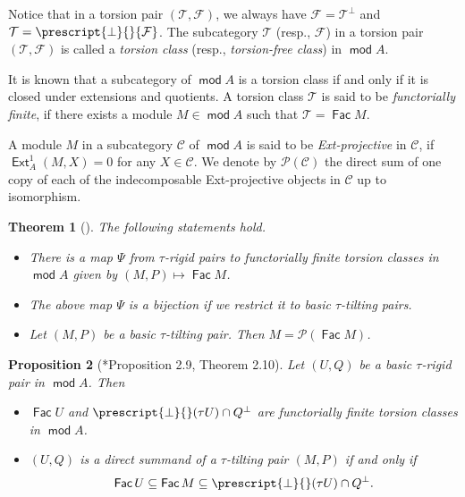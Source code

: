 \documentclass[10pt]{amsart}
\newtheorem{theorem}{Theorem}[section]
\newtheorem{proposition}[theorem]{Proposition}
\theoremstyle{definition}
\theoremstyle{remark}
\numberwithin{equation}{section}
\def\mod{\opname{mod}\nolimits}
\newcommand{\opname}[1]{\operatorname{\mathsf{#1}}}
\newcommand{\Ext}{\opname{Ext}}
\newcommand{\Fac}{\opname{Fac}}
\begin{document}
Notice that in a torsion pair  $(\mathcal T,\mathcal F)$, we always have $\mathcal F=\mathcal T^\bot$ and $\mathcal T= \prescript{\bot}{}{\mathcal F}$.  The subcategory $\mathcal T$ (resp., $\mathcal F$) in a torsion pair $(\mathcal T,\mathcal F)$ is called a \emph{torsion class} (resp., \emph{torsion-free class}) in $\mod A$. 

It is known that a subcategory of $\mod A$ is a torsion class if and only if it is closed under extensions and quotients.
A torsion class $\mathcal T$ is said to be {\em functorially finite}, if there exists a module $M\in\mod A$ such that $\mathcal T=\Fac M$.


A module $M$ in a subcategory $\mathcal C$ of $\mod A$ is said to be {\em Ext-projective} in $\mathcal C$, if 
$\Ext_A^1(M, X)=0$ for any $X\in\mathcal C$. We denote by $\mathcal P(\mathcal C)$ the direct sum of one copy of each of the indecomposable Ext-projective objects in $\mathcal C$ up to isomorphism.



\begin{theorem}[{\cite[Proposition 1.2, Theorem 2.7]{air_2014}}] \label{thm:air-torsion}
The following statements hold.
\begin{itemize}
    \item [(i)] There is a map $\Psi$ 
from $\tau$-rigid pairs to functorially finite torsion classes in $\mod A$
given by $(M,P)\mapsto \Fac M$.

\item[(ii)] The above map $\Psi$ is a bijection if we restrict it to basic $\tau$-tilting pairs.

\item[(iii)] Let $(M,P)$ be a basic $\tau$-tilting pair. Then $M=\mathcal P(\Fac M)$.
\end{itemize}
\end{theorem}



\begin{proposition}[\cite{air_2014}*{Proposition 2.9, Theorem 2.10}]\label{pro-minmax}
 Let $(U,Q)$ be a basic $\tau$-rigid pair in $\mod A$. Then
 \begin{itemize}
 \item[(i)]  $\Fac U$ and  $\prescript{\bot}{}({\tau U})\cap Q^\bot$ are functorially finite torsion classes in $\mod A$.
 \item[(ii)]  $(U,Q)$ is a direct summand of a $\tau$-tilting pair $(M,P)$ if and only if 
 \[\Fac U\subseteq \Fac M\subseteq \prescript{\bot}{}({\tau U})\cap Q^\bot.\]
 \end{itemize}
\end{proposition}
\end{document}
